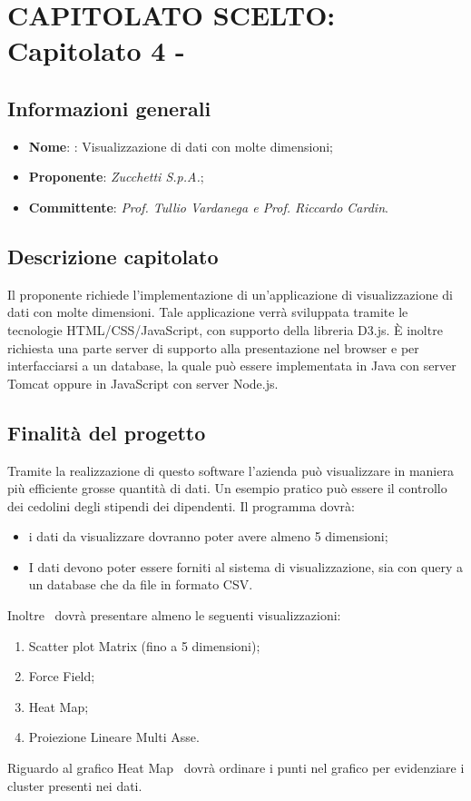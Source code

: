 \section{CAPITOLATO SCELTO: Capitolato 4 - \hd}
\subsection{Informazioni generali}
\begin{itemize}
    \item \textbf{Nome}: \hd: Visualizzazione di dati con molte dimensioni;
    \item \textbf{Proponente}: \emph{Zucchetti S.p.A.};
    \item \textbf{Committente}: \emph{Prof. Tullio Vardanega e Prof. Riccardo Cardin}.
\end{itemize}
\subsection{Descrizione capitolato}
Il proponente richiede l'implementazione di un'applicazione di visualizzazione di dati con molte dimensioni. Tale applicazione verrà sviluppata tramite le tecnologie HTML/CSS/JavaScript, con supporto della libreria D3.js. È inoltre richiesta una parte server di supporto alla presentazione nel browser e per interfacciarsi a un  database, la quale può essere implementata in Java con server Tomcat oppure in JavaScript con server Node.js.
\subsection{Finalità del progetto}
Tramite la realizzazione di questo software l'azienda può visualizzare in maniera più efficiente grosse quantità di dati. Un esempio pratico può essere il controllo dei cedolini degli stipendi dei dipendenti. Il programma dovrà:
\begin{itemize}
    \item i dati da visualizzare dovranno poter avere almeno 5 dimensioni;
    \item I dati devono poter essere forniti al sistema di visualizzazione, sia con query a un database che da file in formato CSV.
\end{itemize}
Inoltre \hd\ dovrà presentare almeno le seguenti visualizzazioni:
\begin{enumerate}
	\item Scatter plot Matrix (fino a 5 dimensioni);
	\item Force Field;
	\item Heat Map;
	\item Proiezione Lineare Multi Asse.
\end{enumerate}
Riguardo al grafico Heat Map \hd\ dovrà ordinare i punti nel grafico per evidenziare i cluster presenti nei dati.
